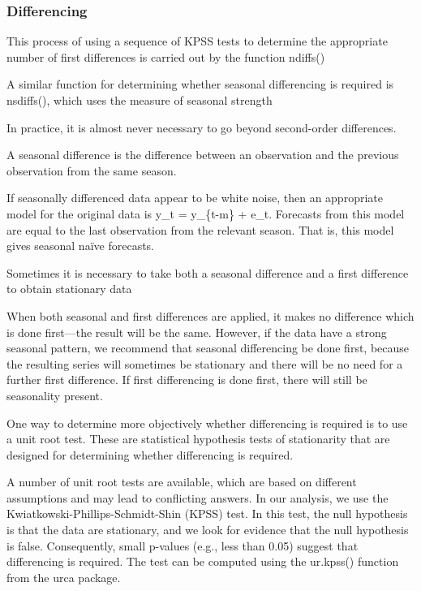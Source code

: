\documentclass[]{book}
\begin{document}
\subsubsection{Differencing}\label{differencing}

This process of using a sequence of KPSS tests to determine the
appropriate number of first differences is carried out by the function
ndiffs()

A similar function for determining whether seasonal differencing is
required is nsdiffs(), which uses the measure of seasonal strength

In practice, it is almost never necessary to go beyond second-order
differences.

A seasonal difference is the difference between an observation and the
previous observation from the same season.

If seasonally differenced data appear to be white noise, then an
appropriate model for the original data is y\_t = y\_\{t-m\} + e\_t.
Forecasts from this model are equal to the last observation from the
relevant season. That is, this model gives seasonal naïve forecasts.

Sometimes it is necessary to take both a seasonal difference and a first
difference to obtain stationary data

When both seasonal and first differences are applied, it makes no
difference which is done first---the result will be the same. However,
if the data have a strong seasonal pattern, we recommend that seasonal
differencing be done first, because the resulting series will sometimes
be stationary and there will be no need for a further first difference.
If first differencing is done first, there will still be seasonality
present.

One way to determine more objectively whether differencing is required
is to use a unit root test. These are statistical hypothesis tests of
stationarity that are designed for determining whether differencing is
required.

A number of unit root tests are available, which are based on different
assumptions and may lead to conflicting answers. In our analysis, we use
the Kwiatkowski-Phillips-Schmidt-Shin (KPSS) test. In this test, the
null hypothesis is that the data are stationary, and we look for
evidence that the null hypothesis is false. Consequently, small p-values
(e.g., less than 0.05) suggest that differencing is required. The test
can be computed using the ur.kpss() function from the urca package.
\end{document}
